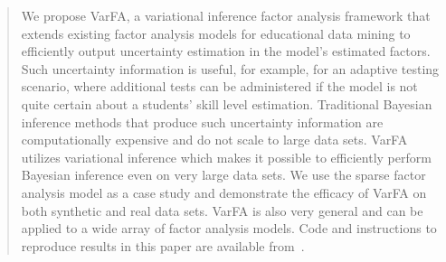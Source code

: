 \documentclass{edm_article}
\begin{document}

\maketitle



\begin{abstract}
We propose VarFA, a variational inference factor analysis framework that extends existing factor analysis models for educational data mining to efficiently output uncertainty estimation in the model's estimated factors. Such uncertainty information is useful, for example, for an adaptive testing scenario, where additional tests can be administered if the model is not quite certain about a students' skill level estimation. Traditional Bayesian inference methods that produce such uncertainty information are computationally expensive and do not scale to large data sets. VarFA utilizes variational inference which makes it possible to efficiently perform Bayesian inference even on very large data sets. We use the sparse factor analysis model as a case study and demonstrate the efficacy of VarFA on both synthetic and real data sets. VarFA is also very general and can be applied to a wide array of factor analysis models. Code and instructions to reproduce results in this paper are available from~{}.
\end{abstract}
\end{document}
